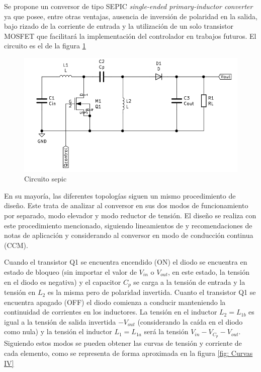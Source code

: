     Se propone un conversor de tipo SEPIC \textit{single-ended primary-inductor converter} ya que posee, entre otras ventajas, ausencia de inversión de polaridad en la salida, bajo rizado de la corriente de entrada \cite{alvarez2019caracterizacion} y la utilización de un solo transistor MOSFET que facilitará la implementación del controlador en trabajos futuros. El circuito es el de la figura \ref{fig: Circuito sepic}
    \begin{figure}
        \centering
         \includegraphics[scale = 0.25]{Figuras/Circuito_BB.png}
        \caption{Circuito sepic}
        \label{fig: Circuito sepic}
    \end{figure}
       
      
    En su mayoría, las diferentes topologías siguen un mismo procedimiento de diseño. Este trata de analizar al  conversor en sus dos modos de funcionamiento por separado, modo elevador y modo reductor de tensión. El diseño se realiza con este procedimiento mencionado, siguiendo lineamientos de \cite{espinosa2017asynchronous} y recomendaciones de notas de aplicación \cite{haifengdesign} y \cite{falin2008designing} considerando al conversor en modo de conducción continua (CCM). 
    
    
    Cuando el transistor Q1 se encuentra encendido (ON) el diodo se encuentra en estado de bloqueo (sin importar el valor de $V_{in}$ o $V_{out}$, en este estado, la tensión en el diodo es negativa) y el capacitor $C_p$ se carga a la tensión de entrada y la tensión en $L_2$ es la misma pero de polaridad invertida. Cuanto el transistor Q1 se encuentra apagado (OFF) el diodo comienza a conducir manteniendo la continuidad de corrientes en los inductores. La tensión en el inductor $L_2 = L_{1b}$ es igual a la tensión de salida invertida $-V_{out}$ (considerando la caída en el diodo como nula) y la tensión el inductor $L_1 = L_{1a}$ será la tensión $V_{in} - V_{C_p} - V_{out}$. Siguiendo estos modos se pueden obtener las curvas de tensión y corriente de cada elemento, como se representa de forma aproximada en la figura \ref{fig: Curvas IV} 
  
